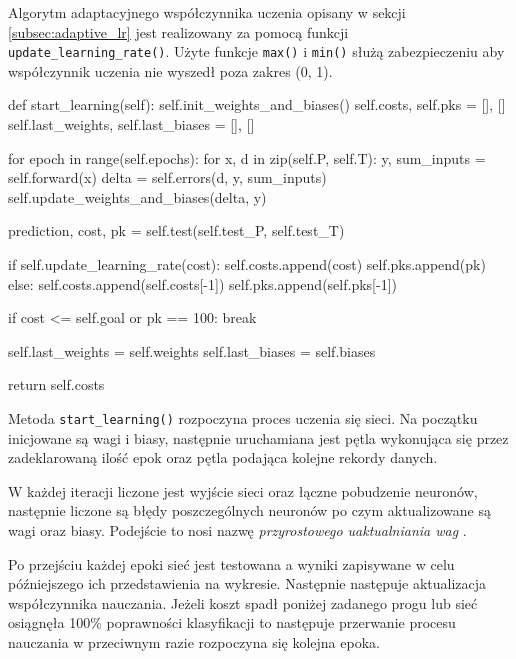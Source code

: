 \documentclass[a4paper,12pt]{article}
\numberwithin{equation}{section}
\begin{document}
\noindent Algorytm adaptacyjnego współczynnika uczenia opisany w sekcji \ref{subsec:adaptive_lr} jest realizowany za pomocą funkcji \texttt{update_learning_rate()}. Użyte funkcje \texttt{max()} i \texttt{min()} służą zabezpieczeniu aby współczynnik uczenia nie wyszedł poza zakres (0, 1).


\begin{pythoncode}
def start_learning(self):
    self.init_weights_and_biases()
    self.costs, self.pks = [], []
    self.last_weights, self.last_biases = [], []

    for epoch in range(self.epochs):
        for x, d in zip(self.P, self.T):
            y, sum_inputs = self.forward(x)
            delta = self.errors(d, y, sum_inputs)
            self.update_weights_and_biases(delta, y)

        prediction, cost, pk = self.test(self.test_P, self.test_T)
        
        if self.update_learning_rate(cost):
            self.costs.append(cost)
            self.pks.append(pk)
        else:
            self.costs.append(self.costs[-1])
            self.pks.append(self.pks[-1])

        if cost <= self.goal or pk == 100:
            break

        self.last_weights = self.weights
        self.last_biases = self.biases

    return self.costs
\end{pythoncode}

\noindent Metoda \texttt{start_learning()} rozpoczyna proces uczenia się sieci. Na początku inicjowane są wagi i biasy, następnie uruchamiana jest pętla wykonująca się przez zadeklarowaną ilość epok oraz pętla podająca kolejne rekordy danych.

\noindent W każdej iteracji liczone jest wyjście sieci oraz łączne pobudzenie neuronów, następnie liczone są błędy poszczególnych neuronów po czym aktualizowane są wagi oraz biasy. Podejście to nosi nazwę \textit{przyrostowego uaktualniania wag} \cite{book_rutkowski}.

\noindent Po przejściu każdej epoki sieć jest testowana a wyniki zapisywane w celu późniejszego ich przedstawienia na wykresie. Następnie następuje aktualizacja współczynnika nauczania. Jeżeli koszt spadł poniżej zadanego progu lub sieć osiągnęła 100\% poprawności klasyfikacji to następuje przerwanie procesu nauczania w przeciwnym razie rozpoczyna się kolejna epoka.
\end{document}
